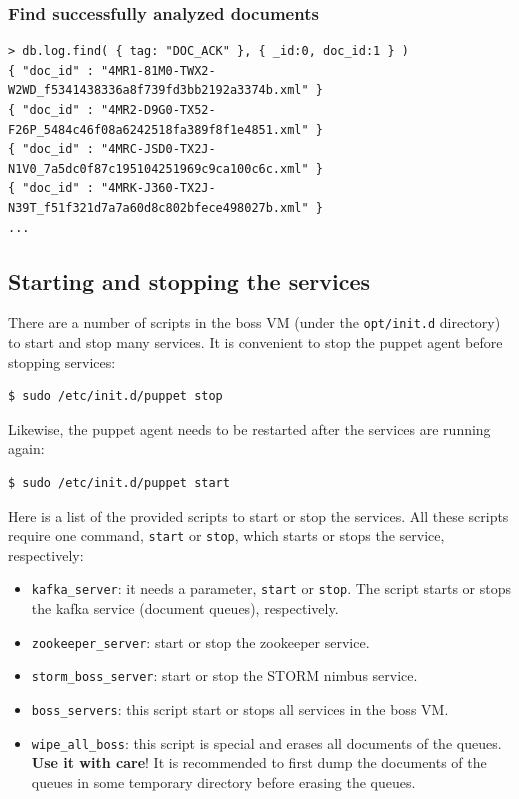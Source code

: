 \documentclass[a4]{article}
\begin{document}
\subsubsection*{Find successfully analyzed documents}

\begin{verbatim}
> db.log.find( { tag: "DOC_ACK" }, { _id:0, doc_id:1 } )
{ "doc_id" : "4MR1-81M0-TWX2-W2WD_f5341438336a8f739fd3bb2192a3374b.xml" }
{ "doc_id" : "4MR2-D9G0-TX52-F26P_5484c46f08a6242518fa389f8f1e4851.xml" }
{ "doc_id" : "4MRC-JSD0-TX2J-N1V0_7a5dc0f87c195104251969c9ca100c6c.xml" }
{ "doc_id" : "4MRK-J360-TX2J-N39T_f51f321d7a7a60d8c802bfece498027b.xml" }
...
\end{verbatim}

\subsection{Starting and stopping the services}
\label{sec:start-stopp-serv}

There are a number of scripts in the boss VM (under the \texttt{opt/init.d}
directory) to start and stop many services. It is convenient to stop the
puppet agent before stopping services:

\begin{verbatim}
$ sudo /etc/init.d/puppet stop
\end{verbatim}

Likewise, the puppet agent needs to be restarted after the services are
running again:

\begin{verbatim}
$ sudo /etc/init.d/puppet start
\end{verbatim}

Here is a list of the provided scripts to start or stop the services. All
these scripts require one command, \texttt{start} or \texttt{stop}, which
starts or stops the service, respectively:
\begin{itemize}
\item \texttt{kafka\_server}: it needs a parameter, \texttt{start} or
  \texttt{stop}. The script starts or stops the kafka service (document
  queues), respectively.
\item \texttt{zookeeper\_server}: start or stop the zookeeper service.
\item \texttt{storm\_boss\_server}: start or stop the STORM nimbus service.
\item \texttt{boss\_servers}: this script start or stops all services in the
  boss VM.
\item \texttt{wipe\_all\_boss}: this script is special and erases all
  documents of the queues. \textbf{Use it with care}! It is recommended to
  first dump the documents of the queues in some temporary directory before
  erasing the queues.
\end{itemize}
\end{document}
